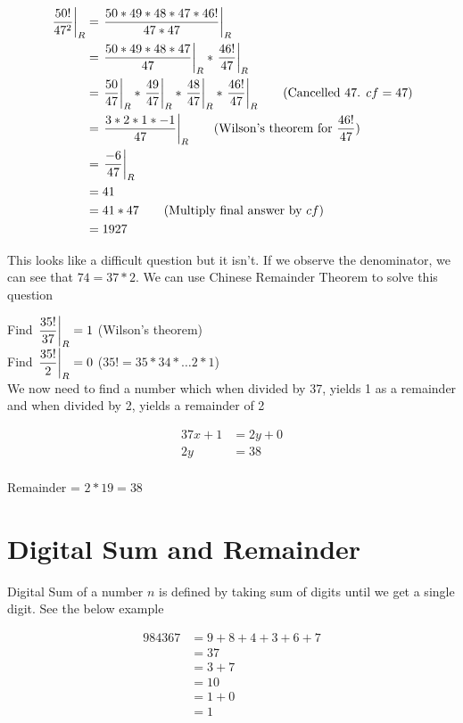 \begin{align*}
    \remFrac{50!}{47^2} &= \remFrac{50 * 49 * 48 * 47 * 46!}{47 * 47} \\
    &= \remFrac{50 * 49 * 48 * 47}{47} * \remFrac{46!}{47} \\
    &= \remFrac{50}{47} * \remFrac{49}{47} * \remFrac{48}{47} * \remFrac{46!}{47} \tag{Cancelled 47. $cf = 47$} \\
    &= \remFrac{3 * 2 * 1 * -1}{47} \tag{Wilson's theorem for $\dfrac{46!}{47}$} \\
    &= \remFrac{-6}{47} \\
    &= 41 \\
    &= 41 * 47 \tag{Multiply final answer by $cf$} \\
    &= 1927 \\
\end{align*}


This looks like a difficult question but it isn't. If we observe the denominator, we can see that $74 = 37 * 2$. We can use Chinese Remainder Theorem to solve this question

Find $\displaystyle{ \left. \frac{35!}{37} \right |_{R} } = 1$ (Wilson's theorem) \\

Find $\displaystyle{ \left. \frac{35!}{2} \right |_{R} } = 0$ ($35! = 35 * 34 * \ldots 2 * 1$) \\

We now need to find a number which when divided by 37, yields 1 as a remainder and when divided by 2, yields a remainder of 2

\begin{align*}
    37x + 1 &= 2y + 0 \\
    2y &= 38  \tag{$x=1 \implies y=19$} \\
\end{align*}

Remainder = $2 * 19 = 38$

\section{Digital Sum and Remainder}

Digital Sum of a number $n$ is defined by taking sum of digits until we get a single digit. See the below example


\begin{align*}
    984367 &= 9 + 8 + 4 + 3 + 6 + 7 \\
    &= 37 \\
    &= 3 + 7 \tag{Digital sum is not a single digit} \\
    &= 10 \\
    &= 1 + 0 \tag{Digital sum is not a single digit} \\
    &= 1
\end{align*}


